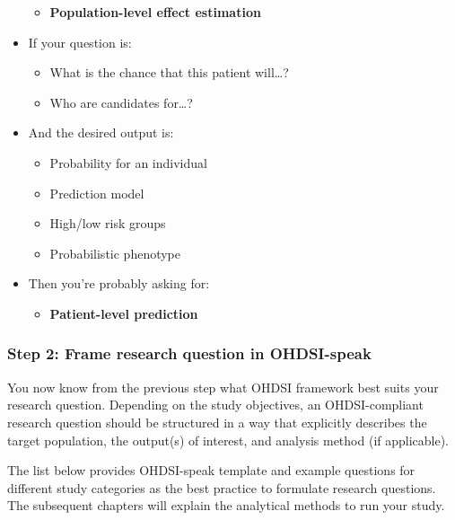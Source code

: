 \documentclass[11pt]{book}
\providecommand{\tightlist}{%
  \setlength{\itemsep}{0pt}\setlength{\parskip}{0pt}}
\theoremstyle{definition}
\theoremstyle{definition}
\theoremstyle{definition}
\theoremstyle{remark}
\begin{document}
\begin{itemize}
  \begin{itemize}
  \tightlist
  \item
    \textbf{Population-level effect estimation}
  \end{itemize}
\item
  If your question is:

  \begin{itemize}
  \tightlist
  \item
    What is the chance that this patient will\ldots?
  \item
    Who are candidates for\ldots?
  \end{itemize}
\item
  And the desired output is:

  \begin{itemize}
  \tightlist
  \item
    Probability for an individual
  \item
    Prediction model
  \item
    High/low risk groups
  \item
    Probabilistic phenotype
  \end{itemize}
\item
  Then you're probably asking for:

  \begin{itemize}
  \tightlist
  \item
    \textbf{Patient-level prediction}
  \end{itemize}
\end{itemize}

\hypertarget{step-2-frame-research-question-in-ohdsi-speak}{%
\subsubsection{Step 2: Frame research question in OHDSI-speak}\label{step-2-frame-research-question-in-ohdsi-speak}}

You now know from the previous step what OHDSI framework best suits your research question. Depending on the study objectives, an OHDSI-compliant research question should be structured in a way that explicitly describes the target population, the output(s) of interest, and analysis method (if applicable).

The list below provides OHDSI-speak template and example questions for different study categories as the best practice to formulate research questions. The subsequent chapters will explain the analytical methods to run your study.
\end{document}
